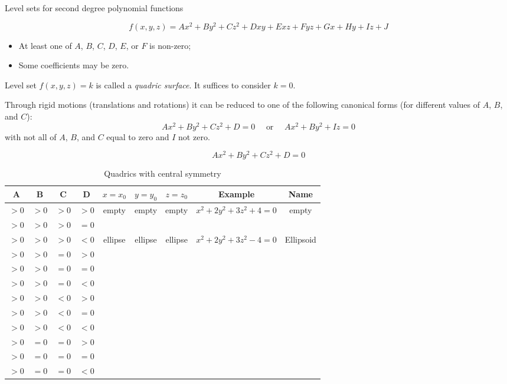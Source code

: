 
Level sets for second degree polynomial functions

$$f(x,y,z) = Ax^2+By^2+Cz^2+Dxy+Exz+Fyz+Gx+Hy+Iz+J$$

\begin{itemize}
  \item At least one of $A$, $B$, $C$, $D$, $E$, or $F$ is non-zero;
  \item Some coefficients may be zero.
\end{itemize}

Level set $f(x,y,z)=k$ is called a \emph{quadric surface}. It suffices to consider $k=0$.

Through rigid motions (translations and rotations) it can be reduced to one of the following canonical forms (for different values of $A$, $B$, and $C$):
%
$$
  Ax^2+By^2+Cz^2+D = 0 \quad \text{ or } \quad
  Ax^2+By^2+Iz=0
$$
%
with not all of $A$, $B$, and $C$ equal to zero and $I$ not zero.

\begin{equation*}
Ax^2+By^2+Cz^2+D = 0
\end{equation*}

\begin{table}
\begin{tabular}{|c|c|c|c|c|c|c|c|c|}
  \hline
  A & B & C & D & $x=x_0$ & $y=y_0$ & $z=z_0$ & Example & Name
  \\
  \hline
  $>0$ & $>0$ & $>0$ & $>0$ & empty & empty & empty & $x^2+2y^2+3z^2+4=0$ & empty \\
  \hline
  $>0$ & $>0$ & $>0$ & $=0$ &  &  &  &  &  \\
  \hline
  $>0$ & $>0$ & $>0$ & $<0$ & ellipse & ellipse & ellipse & $x^2+2y^2+3z^2-4=0$ & Ellipsoid \\
  \hline
  $>0$ & $>0$ & $=0$ & $>0$ &  &  &  &  &  \\
  \hline
  $>0$ & $>0$ & $=0$ & $=0$ &  &  &  &  &  \\
  \hline
  $>0$ & $>0$ & $=0$ & $<0$ &  &  &  &  &  \\
  \hline
  $>0$ & $>0$ & $<0$ & $>0$ &  &  &  &  &  \\
  \hline
  $>0$ & $>0$ & $<0$ & $=0$ &  &  &  &  &  \\
  \hline
  $>0$ & $>0$ & $<0$ & $<0$ &  &  &  &  &  \\
  \hline
  $>0$ & $=0$ & $=0$ & $>0$ &  &  &  &  &  \\
  \hline
  $>0$ & $=0$ & $=0$ & $=0$ &  &  &  &  &  \\
  \hline
  $>0$ & $=0$ & $=0$ & $<0$ &  &  &  &  &  \\
  \hline
\end{tabular}
\caption{Quadrics with central symmetry}
\end{table}


